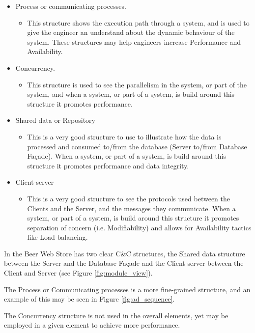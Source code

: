 \begin{itemize}
  \item Process or communicating processes.
	\begin{itemize}
	  \item This structure shows the execution path through a system, and is used to give the engineer an understand about the dynamic behaviour of the system. These structures may help engineers increase Performance and Availability.
	\end{itemize}
  \item Concurrency.
	\begin{itemize}
	  \item This structure is used to see the parallelism in the system, or part of the system, and when a system, or part of a system, is build around this structure it promotes performance. 
	\end{itemize}
  \item Shared data or Repository
	\begin{itemize}
	  \item This is a very good structure to use to illustrate how the data is processed and consumed to/from the database (Server to/from Database Fa\c cade). When a system, or part of a system, is build around this structure it promotes performance and data integrity. 
	\end{itemize}
  \item Client-server
	\begin{itemize}
  		\item This is a very good structure to see the protocols used between the Clients and the Server, and the messages they communicate. When a system, or part of a system, is build around this structure it promotes separation of concern (i.e. Modifiability) and allows for Availability tactics like Load balancing.
	\end{itemize}
\end{itemize}

In the Beer Web Store has two clear C\&C structures, the Shared data structure between the Server and the Database Fa\c cade and the Client-server between the Client and Server (see Figure \ref{fig:module_view}).

The Process or Communicating processes is a more fine-grained structure, and an example of this may be seen in Figure \ref{fig:ad_sequence}.

The Concurrency structure is not used in the overall elements, yet may be employed in a given element to achieve more performance.

